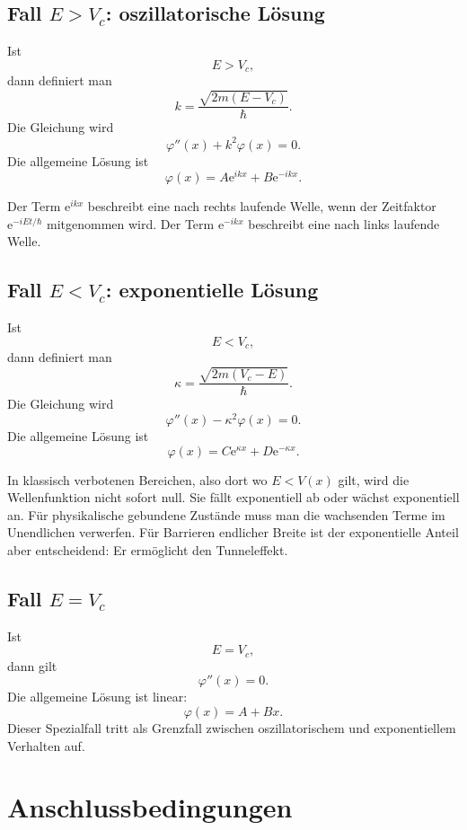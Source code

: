 \subsection{Fall $E>V_c$: oszillatorische Lösung}

Ist
\[
    E>V_c,
\]
dann definiert man
\[
    k=\frac{\sqrt{2m(E-V_c)}}{\hbar}.
\]
Die Gleichung wird
\[
    \varphi''(x)+k^2\varphi(x)=0.
\]
Die allgemeine Lösung ist
\[
    \varphi(x)=A\mathrm{e}^{ikx}+B\mathrm{e}^{-ikx}.
\]

\begin{notebox}
Der Term $\mathrm{e}^{ikx}$ beschreibt eine nach rechts laufende Welle, wenn der Zeitfaktor $\mathrm{e}^{-iEt/\hbar}$ mitgenommen wird. Der Term $\mathrm{e}^{-ikx}$ beschreibt eine nach links laufende Welle.
\end{notebox}

\subsection{Fall $E<V_c$: exponentielle Lösung}

Ist
\[
    E<V_c,
\]
dann definiert man
\[
    \kappa=\frac{\sqrt{2m(V_c-E)}}{\hbar}.
\]
Die Gleichung wird
\[
    \varphi''(x)-\kappa^2\varphi(x)=0.
\]
Die allgemeine Lösung ist
\[
    \varphi(x)=C\mathrm{e}^{\kappa x}+D\mathrm{e}^{-\kappa x}.
\]

\begin{conceptbox}
In klassisch verbotenen Bereichen, also dort wo $E<V(x)$ gilt, wird die Wellenfunktion nicht sofort null. Sie fällt exponentiell ab oder wächst exponentiell an. Für physikalische gebundene Zustände muss man die wachsenden Terme im Unendlichen verwerfen. Für Barrieren endlicher Breite ist der exponentielle Anteil aber entscheidend: Er ermöglicht den Tunneleffekt.
\end{conceptbox}

\subsection{Fall $E=V_c$}

Ist
\[
    E=V_c,
\]
dann gilt
\[
    \varphi''(x)=0.
\]
Die allgemeine Lösung ist linear:
\[
    \varphi(x)=A+Bx.
\]
Dieser Spezialfall tritt als Grenzfall zwischen oszillatorischem und exponentiellem Verhalten auf.

\section{Anschlussbedingungen}

